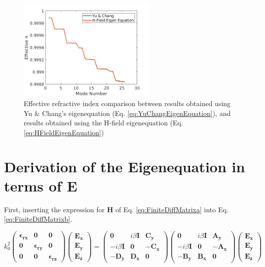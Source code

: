 \documentclass[]{article}
\begin{document}
\begin{figure}[htb]
	\centering
	\includegraphics[width=0.6\textwidth]{Figures/YuChang_HFieldEigenEquation}
	\caption{Effective refractive index comparison between results obtained using Yu \& Chang's eigenequation (Eq. \ref{eq:YuChangEigenEquation}), and results obtained using the H-field eigenequation (Eq. \ref{eq:HFieldEigenEquation})}
\end{figure}

\newpage

\section{Derivation of the Eigenequation in terms of $\mathbf{E}$}

First, inserting the expression for $\mathbf{H}$ of Eq. \ref{eq:FiniteDiffMatrixa} into Eq. \ref{eq:FiniteDiffMatrixb}.

\begin{equation*}
k_0^2
\begin{pmatrix}
\mathbf{\epsilon_{rx}} & \mathbf{0} & \mathbf{0} \\
\mathbf{0} & \mathbf{\epsilon_{ry}} & \mathbf{0} \\
\mathbf{0} & \mathbf{0} & \mathbf{\epsilon_{rz}}
\end{pmatrix}
\begin{pmatrix}
\mathbf{E_x} \\
\mathbf{E_y} \\
\mathbf{E_z}
\end{pmatrix}
=
\begin{pmatrix}
\mathbf{0} & i \beta \mathbf{I} & \mathbf{C_y} \\
-i \beta \mathbf{I} & \mathbf{0} & -\mathbf{C_x} \\
-\mathbf{D_y} & \mathbf{D_x} & \mathbf{0} 
\end{pmatrix}
\begin{pmatrix}
\mathbf{0} & i \beta \mathbf{I} & \mathbf{A_y} \\
-i \beta \mathbf{I} & \mathbf{0} & -\mathbf{A_x} \\
-\mathbf{B_y} & \mathbf{B_x} & \mathbf{0}
\end{pmatrix}
\begin{pmatrix}
\mathbf{E_x} \\
\mathbf{E_y} \\
\mathbf{E_z}
\end{pmatrix}
\end{equation*}
\end{document}
